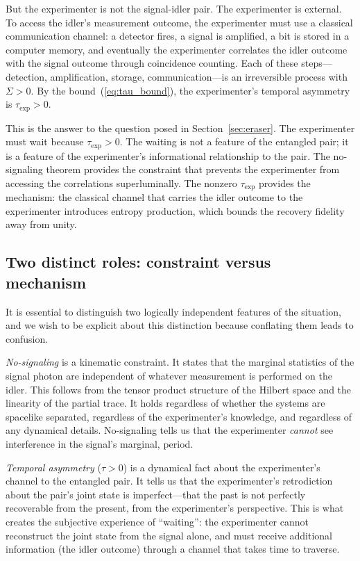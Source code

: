\documentclass[12pt]{article}
\theoremstyle{definition}
\theoremstyle{remark}
\newcommand{\tauasym}{\tau}
\begin{document}
But the experimenter is not the signal-idler pair.  The
experimenter is external.  To access the idler's measurement
outcome, the experimenter must use a classical communication
channel: a detector fires, a signal is amplified, a bit is
stored in a computer memory, and eventually the experimenter
correlates the idler outcome with the signal outcome through
coincidence counting.  Each of these steps---detection,
amplification, storage, communication---is an irreversible process
with $\Sigma > 0$.  By the bound~(\ref{eq:tau_bound}), the
experimenter's temporal asymmetry is $\tauasym_{\text{exp}} > 0$.

This is the answer to the question posed in
Section~\ref{sec:eraser}.  The experimenter must wait because
$\tauasym_{\text{exp}} > 0$.  The waiting is not a feature of
the entangled pair; it is a feature of the experimenter's
informational relationship to the pair.  The no-signaling theorem
provides the constraint that prevents the experimenter from
accessing the correlations superluminally.  The nonzero
$\tauasym_{\text{exp}}$ provides the mechanism: the classical
channel that carries the idler outcome to the experimenter
introduces entropy production, which bounds the recovery
fidelity away from unity.

\subsection{Two distinct roles: constraint versus mechanism}

It is essential to distinguish two logically independent features
of the situation, and we wish to be explicit about this distinction
because conflating them leads to confusion.

\emph{No-signaling} is a kinematic constraint.  It states that the
marginal statistics of the signal photon are independent of
whatever measurement is performed on the idler.  This follows from
the tensor product structure of the Hilbert space and the linearity
of the partial trace.  It holds regardless of whether the systems
are spacelike separated, regardless of the experimenter's knowledge,
and regardless of any dynamical details.  No-signaling tells us that
the experimenter \emph{cannot} see interference in the signal's
marginal, period.

\emph{Temporal asymmetry} ($\tauasym > 0$) is a dynamical fact
about the experimenter's channel to the entangled pair.  It tells
us that the experimenter's retrodiction about the pair's joint
state is imperfect---that the past is not perfectly recoverable
from the present, from the experimenter's perspective.  This is
what creates the subjective experience of ``waiting'': the
experimenter cannot reconstruct the joint state from the signal
alone, and must receive additional information (the idler outcome)
through a channel that takes time to traverse.
\end{document}
